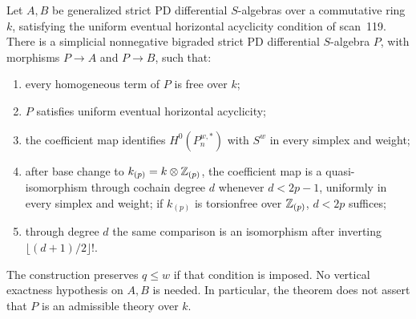 \begin{theorem}
\label{sa08:C21}
Let $A,B$ be generalized strict PD differential $S$-algebras over a
commutative ring $k$, satisfying the uniform eventual horizontal
acyclicity condition of scan~119. There is a simplicial nonnegative
bigraded strict PD differential $S$-algebra $P$, with morphisms
$P\to A$ and $P\to B$, such that:
\begin{enumerate}
\item every homogeneous term of $P$ is free over $k$;
\item $P$ satisfies uniform eventual horizontal acyclicity;
\item the coefficient map identifies $H^0(P_n^{w,*})$ with $S^w$
      in every simplex and weight;
\item after base change to $k_{(p)}=k\otimes\mathbb Z_{(p)}$, the
      coefficient map is a quasi-isomorphism through cochain degree
      $d$ whenever $d<2p-1$, uniformly in every simplex and weight;
      if $k_{(p)}$ is torsionfree over $\mathbb Z_{(p)}$, $d<2p$ suffices;
\item through degree $d$ the same comparison is an isomorphism
      after inverting $\lfloor(d+1)/2\rfloor!$.
\end{enumerate}
The construction preserves $q\leq w$ if that condition is imposed.
No vertical exactness hypothesis on $A,B$ is needed. In particular,
the theorem does not assert that $P$ is an admissible theory over $k$.
\end{theorem}

